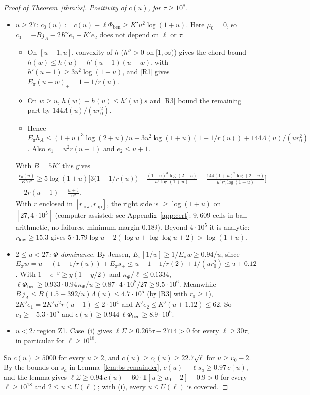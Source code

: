 \begin{proof}[Proof of Theorem~\ref{thm:bs}]
\emph{Positivity of $c(u)$, for $\tau\ge10^8$.}
\begin{itemize}
\item \emph{$u\ge27$: $c_0(u):=c(u)-\ell\Phi_{\mathrm{ben}}\ge K'u^2\log(1+u)$.} Here $\mu_0=0$, so
  $c_0=-Bj_A-2K'e_1-K'e_2$ does not depend on $\ell$ or $\tau$.
  \begin{itemize}
  \item On $[u-1,u]$, convexity of $h$ ($h''>0$ on $[1,\infty)$) gives the chord bound $h(w)\le h(u)-h'(u-1)(u-w)$, with
    $h'(u-1)\ge3u^2\log(1+u)$, and \ref{R1} gives $E_\pi(u-w)_+=1-1/r(u)$.
  \item On $w\ge u$, $h(w)-h(u)\le h'(w)s$ and \ref{R3} bound the remaining part by $144\Lambda(u)/(ur_0^2)$.
  \item Hence $E_\pi h_A\le(1+u)^3\log(2+u)/u-3u^2\log(1+u)(1-1/r(u))+144\Lambda(u)/(ur_0^2)$. Also $e_1=u^2r(u-1)$ and
    $e_2\le u+1$.
  \end{itemize}
  With $B=5K'$ this gives
  \begin{multline*}
    \frac{c_0(u)}{K'u^2}\ge5\log(1+u)\Big[3\big(1-1/r(u)\big)-\frac{(1+u)^3\log(2+u)}{u^3\log(1+u)}
    -\frac{144(1+u)^2\log(2+u)}{u^3r_0^2\log(1+u)}\Big]\\-2r(u-1)-\frac{u+1}{u^2}.
  \end{multline*}
  With $r$ enclosed in $[r_{\mathrm{low}},r_{\mathrm{up}}]$, the right side is $\ge\log(1+u)$ on $[27,4\cdot10^5]$
  (computer-assisted; see Appendix~\ref{app:cert}: $9{,}609$ cells in ball arithmetic, no failures, minimum margin
  $0.189$). Beyond $4\cdot10^5$ it is analytic: $r_{\mathrm{low}}\ge15.3$ gives
  $5\cdot1.79\log u-2(\log u+\log\log u+2)>\log(1+u)$.
\item \emph{$2\le u<27$: $\Phi$-dominance.} By Jensen, $E_\pi[1/w]\ge1/E_\pi w\ge0.94/u$, since
  $E_\pi w=u-(1-1/r(u))+E_\pi s_+\le u-1+1/r(2)+1/(ur_0^2)\le u+0.12$. With $1-e^{-y}\ge y(1-y/2)$ and $\kappa_\Phi/\ell\le0.1334$,
  $\ell\Phi_{\mathrm{ben}}\ge0.933\cdot0.94\,\kappa_\Phi/u\ge0.87\cdot4\cdot10^8/27\ge9.5\cdot10^6$. Meanwhile
  $B\,j_A\le B(1.5+392/u)\Lambda(u)\le4.7\cdot10^5$ (by \ref{R3} with $r_0\ge1$), $2K'e_1=2K'u^2r(u-1)\le2\cdot10^4$ and
  $K'e_2\le K'(u+1.12)\le62$. So $c_0\ge-5.3\cdot10^5$ and $c(u)\ge0.944\,\ell\Phi_{\mathrm{ben}}\ge8.9\cdot10^6$.
\item \emph{$u<2$:} region Z1. Case~(i) gives $\ell\Sigma\ge0.265\tau-2714>0$ for every $\ell\ge30\tau$, in particular for
  $\ell\ge10^{18}$.
\end{itemize}
So $c(u)\ge5000$ for every $u\ge2$, and $c(u)\ge c_0(u)\ge22.7\sqrt\ell$ for $u\ge u_0-2$. By the bounds on $s_a$ in
Lemma~\ref{lem:bs-remainder}, $c(u)+\ell s_a\ge0.97\,c(u)$, and the lemma gives
$\ell\Sigma\ge0.94\,c(u)-60\cdot\mathbf 1[u\ge u_0-2]-0.9>0$ for every $\ell\ge10^{18}$ and $2\le u\le U(\ell)$; with (i), every
$u\le U(\ell)$ is covered.


\end{proof}
